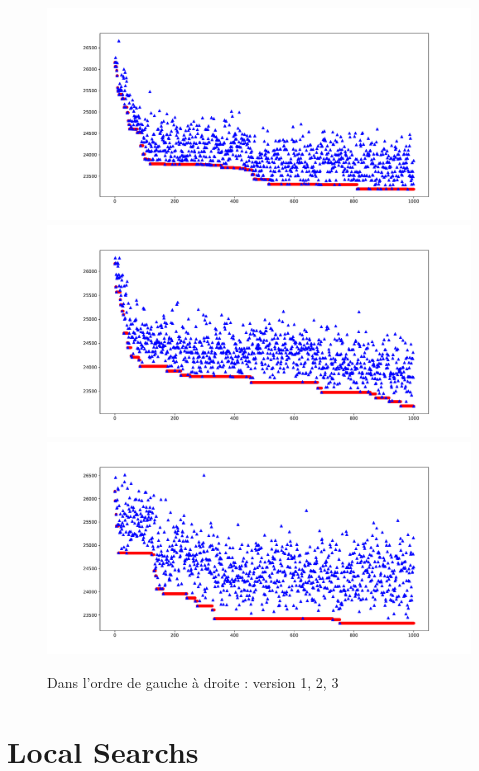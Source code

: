 \documentclass[10pt,a4paper]{article}
\begin{document}
\begin{figure}

\includegraphics[scale=.4]{images/without_error_1000_v1}
\includegraphics[scale=.4]{images/without_error_1000_v2}
\includegraphics[scale=.4]{images/without_error_1000_v3}
\caption{Dans l'ordre de gauche à droite : version 1, 2, 3}
\label{comparelocal}
\end{figure}


\section{Local Searchs}
\end{document}
